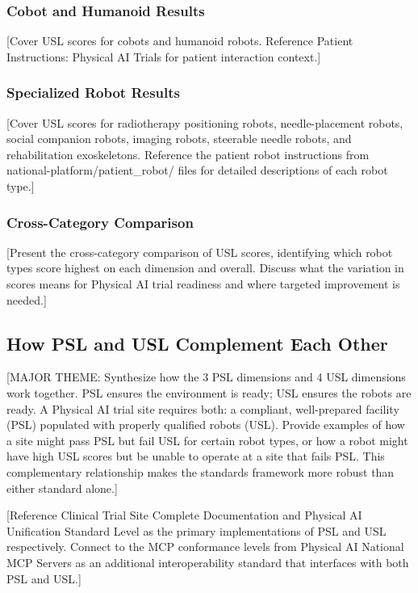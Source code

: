 \subsubsection{Cobot and Humanoid Results}
[Cover USL scores for cobots and humanoid robots. Reference Patient
Instructions: Physical AI Trials \cite{patient-instructions-paper} for patient
interaction context.]

\subsubsection{Specialized Robot Results}
[Cover USL scores for radiotherapy positioning robots, needle-placement robots,
social companion robots, imaging robots, steerable needle robots, and
rehabilitation exoskeletons. Reference the patient robot instructions from
national-platform/patient\_robot/ files for detailed descriptions of each
robot type.]

\subsubsection{Cross-Category Comparison}
[Present the cross-category comparison of USL scores, identifying which robot
types score highest on each dimension and overall. Discuss what the variation
in scores means for Physical AI trial readiness and where targeted improvement
is needed.]

\subsection{How PSL and USL Complement Each Other}
\label{subsec:psl-usl-complement}

[MAJOR THEME: Synthesize how the 3 PSL dimensions and 4 USL dimensions work
together. PSL ensures the environment is ready; USL ensures the robots are
ready. A Physical AI trial site requires both: a compliant, well-prepared
facility (PSL) populated with properly qualified robots (USL). Provide examples
of how a site might pass PSL but fail USL for certain robot types, or how a
robot might have high USL scores but be unable to operate at a site that fails
PSL. This complementary relationship makes the standards framework more robust
than either standard alone.]

[Reference Clinical Trial Site Complete Documentation \cite{site-docs} and
Physical AI Unification Standard Level \cite{usl-standard} as the primary
implementations of PSL and USL respectively. Connect to the MCP conformance
levels from Physical AI National MCP Servers \cite{national-mcp-paper} as an
additional interoperability standard that interfaces with both PSL and USL.]

